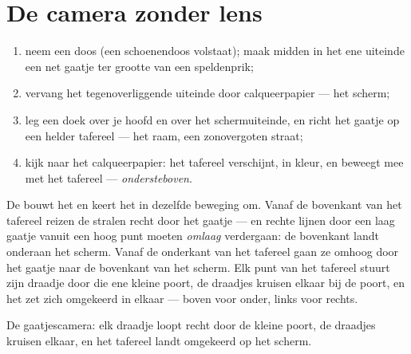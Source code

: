 \section{De camera zonder lens}

\begin{method}\label{met:g6:light-propagation:pinhole}
\begin{enumerate}
  \item neem een doos (een schoenendoos volstaat); maak midden in
        het ene uiteinde een net gaatje ter grootte van een speldenprik;
  \item vervang het tegenoverliggende uiteinde door calqueerpapier
        --- het scherm;
  \item leg een doek over je hoofd en over het schermuiteinde, en
        richt het gaatje op een helder tafereel --- het raam, een
        zonovergoten straat;
  \item kijk naar het calqueerpapier: het tafereel verschijnt, in
        kleur, en beweegt mee met het tafereel ---
        \emph{ondersteboven}.
\end{enumerate}
\end{method}

\begin{proposition}\label{prop:g6:light-propagation:inverted}
De  bouwt het  en keert het in
dezelfde beweging om. Vanaf de bovenkant van het tafereel reizen de
stralen recht door het gaatje --- en rechte lijnen door een laag
gaatje vanuit een hoog punt moeten \emph{omlaag} verdergaan: de
bovenkant landt onderaan het scherm. Vanaf de onderkant van het
tafereel gaan ze omhoog door het gaatje naar de bovenkant van het
scherm. Elk punt van het tafereel stuurt zijn draadje door die ene
kleine poort, de draadjes kruisen elkaar bij de poort, en het 
zet zich omgekeerd in elkaar --- boven voor onder, links voor rechts.
\end{proposition}

\begin{omfigure}

{\small De gaatjescamera: elk draadje  loopt recht door de kleine
poort, de draadjes kruisen elkaar, en het tafereel landt omgekeerd op
het scherm.}
\end{omfigure}

